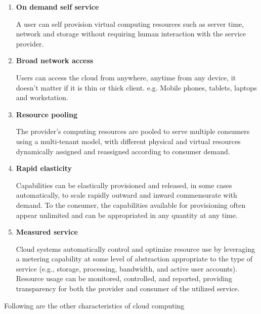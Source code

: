    \par
    \begin{enumerate}
    \item \textbf{On demand self service}
        \par A user can self provision virtual computing resources such as server time, network and storage without requiring human interaction with the service provider\cite{wiki}.
    \item \textbf{Broad network access}
        \par Users can access the cloud from anywhere, anytime from any device, it doesn't matter if it is thin or thick client. e.g. Mobile phones, tablets, laptops and workstation\cite{wiki}. 
    \item \textbf{Resource pooling}
        \par The provider's computing resources are pooled to serve multiple consumers using a multi-tenant model, with different physical and virtual resources dynamically assigned and reassigned according to consumer demand\cite{wiki}. 
    \item \textbf{Rapid elasticity}
        \par Capabilities can be elastically provisioned and released, in some cases automatically, to scale rapidly outward and inward commensurate with demand. To the consumer, the capabilities available for provisioning often appear unlimited and can be appropriated in any quantity at any time\cite{wiki}.
    \item \textbf{Measured service}
        \par Cloud systems automatically control and optimize resource use by leveraging a metering capability at some level of abstraction appropriate to the type of service (e.g., storage, processing, bandwidth, and active user accounts). Resource usage can be monitored, controlled, and reported, providing transparency for both the provider and consumer of the utilized service\cite{wiki}.
    \end{enumerate}
    
    \par Following are the other characteristics of cloud computing
    
